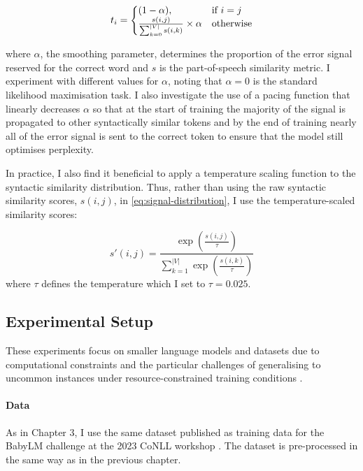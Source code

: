 \begin{equation}
\label{eq:signal-distribution}
    t_i=\left\{
  \begin{array}{@{}ll@{}}
    (1-\alpha), & \text{if}\ i=j \\
    \frac{s(i,j)}{\sum_{k=0}^{|V|}{s(i,k)}} \times \alpha & \text{otherwise}
  \end{array}\right.
\end{equation}

\noindent

where $\alpha$, the smoothing parameter, determines the proportion of the error signal reserved for the correct word and $s$ is the part-of-speech similarity metric. I experiment with different values for $\alpha$, noting that $\alpha=0$ is the standard likelihood maximisation task. I also investigate the use of a pacing function that linearly decreases $\alpha$ so that at the start of training the majority of the signal is propagated to other syntactically similar tokens and by the end of training nearly all of the error signal is sent to the correct token to ensure that the model still optimises perplexity. 

In practice, I also find it beneficial to apply a temperature scaling function to the syntactic similarity distribution. Thus, rather than using the raw syntactic similarity scores, $s(i,j)$, in \cref{eq:signal-distribution}, I use the temperature-scaled similarity scores:

$$
s'(i,j) = \frac{\exp\left(\frac{s(i,j)}{\tau}\right)}{\sum_{k=1}^{|V|} \exp\left(\frac{s(i,k)}{\tau}\right)}
$$
where $\tau$ defines the temperature which I set to $\tau=0.025$.

\subsection{Experimental Setup}
\label{subsection:experimental_setup}

These experiments focus on smaller language models and datasets due to computational constraints and the particular challenges of generalising to uncommon instances under resource-constrained training conditions \citep{warstadt2023babylm1}. 

\paragraph{Data} \label{paragraph:data} As in Chapter 3, I use the same dataset published as training data for the BabyLM challenge at the 2023 CoNLL workshop \citep{warstadt2023babylm1}. The dataset is pre-processed in the same way as in the previous chapter. 

